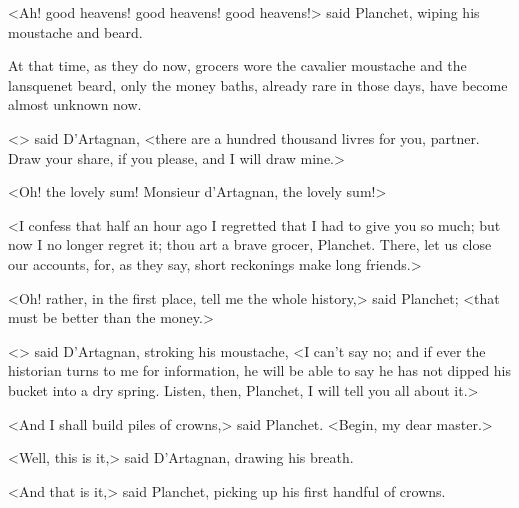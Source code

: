 <Ah! good heavens! good heavens! good heavens!> said Planchet, wiping his moustache and beard.

At that time, as they do now, grocers wore the cavalier moustache and the lansquenet beard, only the money baths, already rare in those days, have become almost unknown now.

<> said D'Artagnan, <there are a hundred thousand livres for you, partner. Draw your share, if you please, and I will draw mine.>

<Oh! the lovely sum! Monsieur d'Artagnan, the lovely sum!>

<I confess that half an hour ago I regretted that I had to give you so much; but now I no longer regret it; thou art a brave grocer, Planchet. There, let us close our accounts, for, as they say, short reckonings make long friends.>

<Oh! rather, in the first place, tell me the whole history,> said Planchet; <that must be better than the money.>

<> said D'Artagnan, stroking his moustache, <I can't say no; and if ever the historian turns to me for information, he will be able to say he has not dipped his bucket into a dry spring. Listen, then, Planchet, I will tell you all about it.>

<And I shall build piles of crowns,> said Planchet. <Begin, my dear master.>

<Well, this is it,> said D'Artagnan, drawing his breath.

<And that is it,> said Planchet, picking up his first handful of crowns. 